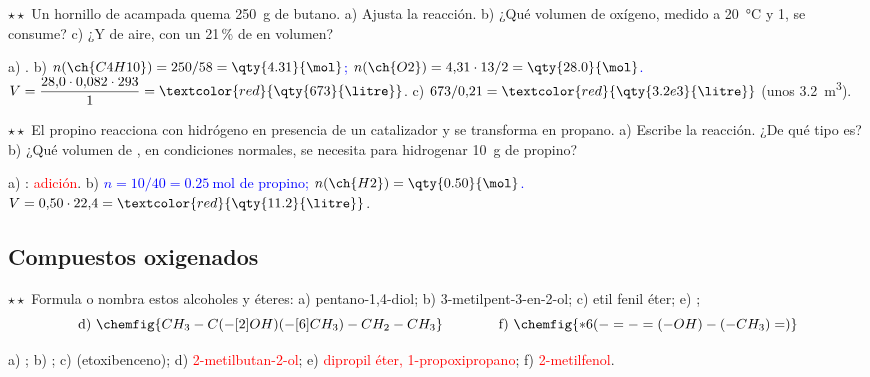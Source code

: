 \begin{exercise}
    \(\star\star\) Un hornillo de acampada quema \qty{250}{\gram} de butano. a) Ajusta la reacción. b) ¿Qué volumen de oxígeno,
    medido a \qty{20}{\degreeCelsius} y \qty{1}{\atm}, se consume? c) ¿Y de aire, con un 21\,\% de  en volumen?
    \begin{solu}
        a) \textcolor{red}{}. b) \textcolor{blue}{\(n(\ch{C4H10}) = 250/58 = \qty{4.31}{\mol}\);
        \(n(\ch{O2}) = 4{,}31 \cdot 13/2 = \qty{28.0}{\mol}\).} \(V = \dfrac{28{,}0 \cdot 0{,}082 \cdot 293}{1} =
        \textcolor{red}{\qty{673}{\litre}}\). c) \(673/0{,}21 = \textcolor{red}{\qty{3.2e3}{\litre}}\) (unos \qty{3.2}{\metre\cubed}).
    \end{solu}
\end{exercise}

\begin{exercise}
    \(\star\star\) El propino reacciona con hidrógeno en presencia de un catalizador y se transforma en propano. a) Escribe la
    reacción. ¿De qué tipo es? b) ¿Qué volumen de , en condiciones normales, se necesita para hidrogenar \qty{10}{\gram} de
    propino?
    \begin{solu}
        a) \textcolor{red}{}: \textcolor{red}{adición}. b) \textcolor{blue}{\(n = 10/40 =
        \qty{0.25}{\mol}\) de propino; \(n(\ch{H2}) = \qty{0.50}{\mol}\).} \(V = 0{,}50 \cdot 22{,}4 = \textcolor{red}{\qty{11.2}{\litre}}\).
    \end{solu}
\end{exercise}

\subsection{Compuestos oxigenados}

\begin{exercise}
    \(\star\star\) Formula o nombra estos alcoholes y éteres: a) pentano-1,4-diol; b) 3-metilpent-3-en-2-ol; c) etil fenil éter;
    e) ;
    \[ \text{d)}\ \chemfig{CH_3-C(-[2]OH)(-[6]CH_3)-CH_2-CH_3} \qquad\qquad \text{f)}\ \chemfig{*6(-=-=(-OH)-(-CH_3)=)} \]
    \begin{solu}
        a) \textcolor{red}{}; b) \textcolor{red}{};
        c) \textcolor{red}{} (etoxibenceno); d) \textcolor{red}{2-metilbutan-2-ol};
        e) \textcolor{red}{dipropil éter, 1-propoxipropano}; f) \textcolor{red}{2-metilfenol}.
    \end{solu}
\end{exercise}

